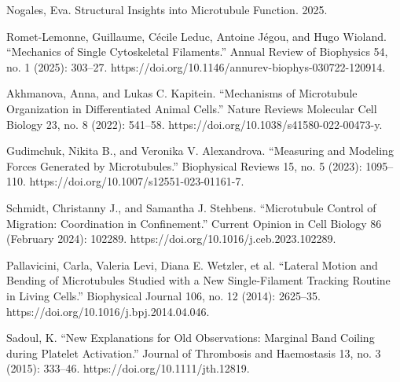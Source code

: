 
\begin{thebibliography}{00} %

Nogales, Eva. Structural Insights into Microtubule Function. 2025. %

Romet-Lemonne, Guillaume, Cécile Leduc, Antoine Jégou, and Hugo Wioland. “Mechanics of Single Cytoskeletal Filaments.” Annual Review of Biophysics 54, no. 1 (2025): 303–27. https://doi.org/10.1146/annurev-biophys-030722-120914. %

Akhmanova, Anna, and Lukas C. Kapitein. “Mechanisms of Microtubule Organization in Differentiated Animal Cells.” Nature Reviews Molecular Cell Biology 23, no. 8 (2022): 541–58. https://doi.org/10.1038/s41580-022-00473-y.

Gudimchuk, Nikita B., and Veronika V. Alexandrova. “Measuring and Modeling Forces Generated by Microtubules.” Biophysical Reviews 15, no. 5 (2023): 1095–110. https://doi.org/10.1007/s12551-023-01161-7. %

Schmidt, Christanny J., and Samantha J. Stehbens. “Microtubule Control of Migration: Coordination in Confinement.” Current Opinion in Cell Biology 86 (February 2024): 102289. https://doi.org/10.1016/j.ceb.2023.102289. %

Pallavicini, Carla, Valeria Levi, Diana E. Wetzler, et al. “Lateral Motion and Bending of Microtubules Studied with a New Single-Filament Tracking Routine in Living Cells.” Biophysical Journal 106, no. 12 (2014): 2625–35. https://doi.org/10.1016/j.bpj.2014.04.046. %

Sadoul, K. “New Explanations for Old Observations: Marginal Band Coiling during Platelet Activation.” Journal of Thrombosis and Haemostasis 13, no. 3 (2015): 333–46. https://doi.org/10.1111/jth.12819. %


\end{thebibliography}
